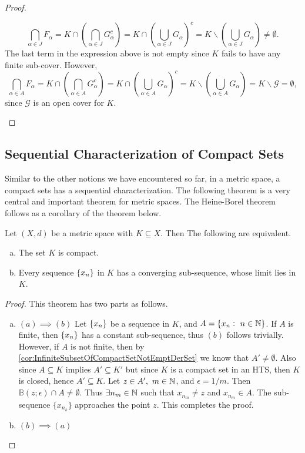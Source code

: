 \begin{proof}
\begin{itemize}
\begin{itemize}
			\[ \bigcap_{\alpha \in J} F_\alpha = K \cap (\bigcap_{\alpha\in J} G_\alpha^c) = K \cap (\bigcup_{\alpha\in J} G_\alpha)^c =  K \backslash (\bigcup_{\alpha\in J} G_\alpha) \neq \emptyset.  \]
			The last term in the expression above is not empty since $K$ fails to have any finite sub-cover. However, 
			\[ \bigcap_{\alpha \in A} F_\alpha = K \cap (\bigcap_{\alpha\in A} G_\alpha^c) = K \cap (\bigcup_{\alpha\in A} G_\alpha)^c =  K \backslash (\bigcup_{\alpha\in A} G_\alpha) =  K \backslash \mathcal{G} = \emptyset,  \]
			since $\mathcal{G}$ is an open cover for $K$.
		\end{itemize}
	\end{itemize}
\end{proof}


\subsection{Sequential Characterization of Compact Sets}

Similar to the other notions we have encountered so far, in a metric space, a compact sets has a sequential characterization. The following theorem is a very central and important theorem for metric spaces. The Heine-Borel theorem follows as a corollary of the theorem below.

\begin{theorem}
	\label{thm:SequencialCompactness}
	Let $(X,d)$ be a metric space with $K \subseteq X$. Then The following are equivalent.
	\begin{enumerate}[(a)]
		\item The set $K$ is compact.
		\item Every sequence $\{x_n\}$ in $K$ has a converging sub-sequence, whose limit lies in $K$.
	\end{enumerate}
\end{theorem}
\begin{proof}
	This theorem has two parts as follows.
	\begin{enumerate}[(a)]
		\item $(a) \implies (b)$ Let $\{x_n\}$ be a sequence in $K$, and $A = \{ x_n:\ n\in\mathbb{N} \}$. If $A$ is finite, then $\{x_n\}$ has a constant sub-sequence, thus $(b)$ follows trivially. However, if $A$ is not finite, then by \autoref{cor:InfiniteSubsetOfCompactSetNotEmptDerSet} we know that $A' \neq \emptyset$. Also since $A \subseteq K$ implies $A' \subseteq K'$ but since $K$ is a compact set in an HTS, then $K$ is closed, hence $A' \subseteq K$. Let $z \in A',\ m \in \mathbb{N}$, and $\epsilon=1/m$. Then $\mathbb{B}(z;\epsilon) \cap A \neq \emptyset$. Thus $\exists n_m \in \mathbb{N}$ such that $x_{n_m}\neq z$ and $x_{n_m} \in A$. The sub-sequence $\{x_{n_k}\}$ approaches the point $z$. This completes the proof.
		\item $(b) \implies (a)$
	\end{enumerate}
\end{proof}

